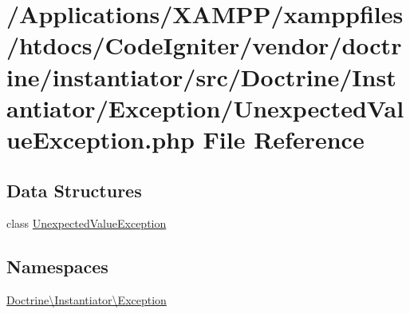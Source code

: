\hypertarget{_unexpected_value_exception_8php}{}\section{/\+Applications/\+X\+A\+M\+P\+P/xamppfiles/htdocs/\+Code\+Igniter/vendor/doctrine/instantiator/src/\+Doctrine/\+Instantiator/\+Exception/\+Unexpected\+Value\+Exception.php File Reference}
\label{_unexpected_value_exception_8php}
\subsection*{Data Structures}
\begin{DoxyCompactItemize}
\item 
class \mbox{\hyperlink{class_doctrine_1_1_instantiator_1_1_exception_1_1_unexpected_value_exception}{Unexpected\+Value\+Exception}}
\end{DoxyCompactItemize}
\subsection*{Namespaces}
\begin{DoxyCompactItemize}
\item 
 \mbox{\hyperlink{namespace_doctrine_1_1_instantiator_1_1_exception}{Doctrine\textbackslash{}\+Instantiator\textbackslash{}\+Exception}}
\end{DoxyCompactItemize}

